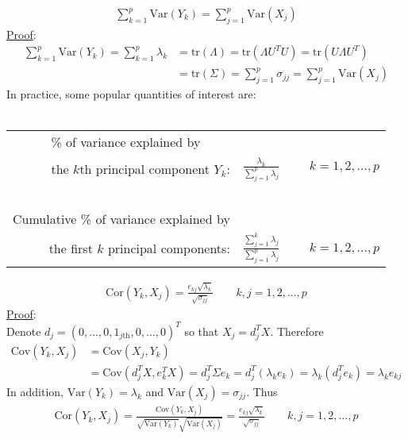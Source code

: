 \documentclass[12pt]{extarticle}
\newcommand{\<}{\langle}
\renewcommand{\>}{\rangle}
\theoremstyle{definition}
\begin{document}
\begin{tcolorbox}[enhanced, drop fuzzy shadow, title=Variance (Result 6.2)]
\begin{align*}
    \sum^p_{k=1} \text{Var}(Y_k) = \sum^p_{j=1} \text{Var}(X_j)
\end{align*}
\underline{Proof}:
\begin{align*}
    \sum^p_{k=1} \text{Var}(Y_k) = \sum^p_{k=1} \lambda_k &= \text{tr}(\Lambda) = \text{tr}(\Lambda U^T U) = \text{tr}(U \Lambda U^T)\\
    &= \text{tr}(\Sigma) = \sum^p_{j=1}\sigma_{jj} = \sum^p_{j=1} \text{Var}(X_j)
\end{align*}
In practice, some popular quantities of interest are:\\ \ \\
\begin{tabular}{rl}
\% of variance explained by $\qquad$ &\\
the $k$th principal component $Y_k$:& $\frac{\lambda_k}{\sum^p_{j=1}\lambda_j}$ $\qquad k=1,2,...,p$\\ \ \\
Cumulative \% of variance explained by &\\
the first $k$ principal components:& $\frac{\sum^k_{j=1}\lambda_j}{\sum^p_{j=1}\lambda_j}$ $\qquad k=1,2,...,p$
\end{tabular}
\end{tcolorbox}

\begin{tcolorbox}[enhanced, drop fuzzy shadow, title=Correlation (Result 6.3)]
\begin{align*}
    \text{Cor}(Y_k, X_j) =\frac{e_{kj}\sqrt{\lambda_k}}{\sqrt{\sigma_{jj}}} \qquad k,j=1,2,...,p
\end{align*}
\underline{Proof}:\\
Denote $d_j =(0,...,0,1_{j\text{th}},0,...,0)^T$ so that $X_j =d_j^T X$. Therefore
\begin{align*}
    \text{Cov}(Y_k, X_j)&= \text{Cov}(X_j, Y_k)\\
    &=\text{Cov}(d_j^T X, e^T_k X)= d^T_j \Sigma e_k =d_j^T (\lambda_k e_k) = \lambda_k(d_j^T e_k) =\lambda_k e_{kj}
\end{align*}
In addition, $\text{Var}(Y_k)=\lambda_k$ and $\text{Var}(X_j)=\sigma_{jj}$. Thus
\begin{align*}
    \text{Cor}(Y_k, X_j)=\frac{\text{Cov}(Y_k, X_j)}{\sqrt{\text{Var}(Y_k)}\sqrt{\text{Var}(X_j)}} = \frac{e_{kj} \sqrt{\lambda_k}}{\sqrt{\sigma_{jj}}} \qquad k,j=1,2,...,p
\end{align*}
\end{tcolorbox}
\end{document}
